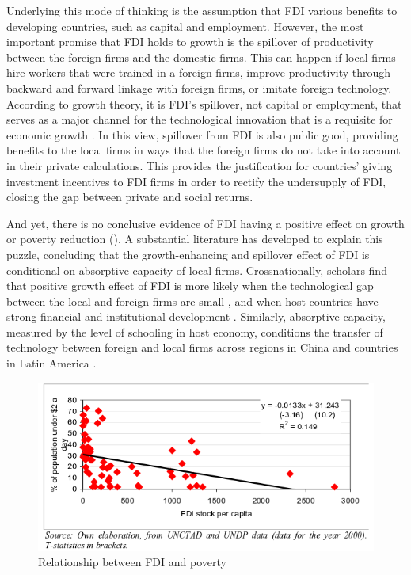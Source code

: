 \documentclass[12pt]{article}
\begin{document}
Underlying this mode of thinking is the assumption that FDI various benefits to developing countries, such as capital and employment. However, the most important promise that FDI holds to growth is the spillover of productivity between the foreign firms and the domestic firms. This can happen if local firms hire workers that were trained in a foreign firms, improve productivity through backward and forward linkage with foreign firms, or imitate foreign technology. According to growth theory, it is FDI's spillover, not capital or employment, that serves as a major channel for the technological innovation that is a requisite for economic growth \citep{Findlay1978}. In this view, spillover from FDI is also public good, providing benefits to the local firms in ways that the foreign firms do not take into account in their private calculations. This provides the justification for countries' giving investment incentives to FDI firms in order to rectify the undersupply of FDI, closing the gap between private and social returns. 

And yet, there is no conclusive evidence of FDI having a positive effect on growth \citep{Nair-Reichert2001, Carkovic2002} or poverty reduction \citep{Guerra2009} (). A substantial literature has developed to explain this puzzle, concluding that the growth-enhancing and spillover effect of FDI is conditional on absorptive capacity of local firms. Crossnationally, scholars find that positive growth effect of FDI is more likely when the technological gap between the local and foreign firms are small \citep{Nunnenkamp2004}, and when host countries have strong financial and institutional development \citep{ Durham2004}. Similarly, absorptive capacity, measured by the level of schooling in host economy, conditions the transfer of technology between foreign and local firms across regions in China \citep{Fu2008} and countries in Latin America \citep{Willem2004}.

\begin{figure}[!ht]
\includegraphics[width=\textwidth, height=\textheight,keepaspectratio]{../figure/fdi_poverty}
\caption{Relationship between FDI and poverty}
\label{fig:fdipoverty}
\end{figure}
\end{document}
